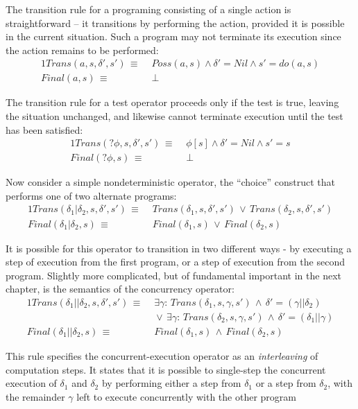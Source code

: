 The transition rule for a programing consisting of a single action
is straightforward -- it transitions by performing the action, provided
it is possible in the current situation. Such a program may not terminate
its execution since the action remains to be performed:\begin{alignat*}{1}
Trans(a,s,\delta',s')\,\equiv\, & \, Poss(a,s)\wedge\delta'=Nil\wedge s'=do(a,s)\\
Final(a,s)\,\equiv\, & \,\bot\end{alignat*}


The transition rule for a test operator proceeds only if the test
is true, leaving the situation unchanged, and likewise cannot terminate
execution until the test has been satisfied:\begin{alignat*}{1}
Trans(?\phi,s,\delta',s')\,\equiv\, & \,\phi[s]\wedge\delta'=Nil\wedge s'=s\\
Final(?\phi,s)\,\equiv\, & \,\bot\end{alignat*}


Now consider a simple nondeterministic operator, the {}``choice''
construct that performs one of two alternate programs:\begin{alignat*}{1}
Trans(\delta_{1}|\delta_{2},s,\delta',s')\,\equiv\, & \, Trans(\delta_{1},s,\delta',s')\,\vee\, Trans(\delta_{2},s,\delta',s')\\
Final(\delta_{1}|\delta_{2},s)\,\equiv\, & \, Final(\delta_{1},s)\,\vee\, Final(\delta_{2},s)\end{alignat*}


It is possible for this operator to transition in two different ways
- by executing a step of execution from the first program, or a step
of execution from the second program. Slightly more complicated, but
of fundamental important in the next chapter, is the semantics of
the concurrency operator:\begin{alignat*}{1}
Trans(\delta_{1}||\delta_{2},s,\delta',s')\,\equiv\, & \,\exists\gamma:\, Trans(\delta_{1},s,\gamma,s')\,\wedge\,\delta'=(\gamma||\delta_{2})\\
 & \,\vee\,\exists\gamma:\, Trans(\delta_{2},s,\gamma,s')\,\wedge\,\delta'=(\delta_{1}||\gamma)\\
Final(\delta_{1}||\delta_{2},s)\,\equiv\, & \, Final(\delta_{1},s)\,\wedge\, Final(\delta_{2},s)\end{alignat*}


This rule specifies the concurrent-execution operator as an \emph{interleaving}
of computation steps. It states that it is possible to single-step
the concurrent execution of $\delta_{1}$ and $\delta_{2}$ by performing
either a step from $\delta_{1}$ or a step from $\delta_{2}$, with
the remainder $\gamma$ left to execute concurrently with the other
program

